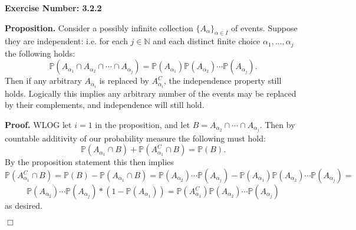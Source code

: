 \documentclass{article}
\begin{document}
\noindent \textbf{Exercise Number: 3.2.2}  %

\bigskip

\noindent \textbf{Proposition.} Consider a possibly infinite collection $\{A_{\alpha}\}_{\alpha \in I}$
of events. Suppose they are independent: i.e. for each $j \in \mathbb{N}$ and each distinct finite choice $\alpha_1, ..., \alpha_j$ the following holds: \[\mathbb{P}(A_{\alpha_1} \cap A_{\alpha_2} \cap \cdots \cap A_{\alpha_j}) = \mathbb{P} (A_{\alpha_1}) \mathbb{P} (A_{\alpha_2}) \cdots \mathbb{P}( A_{\alpha_j}).\] Then if any arbitrary $A_{\alpha_i}$ is replaced by $A_{\alpha_i}^C$, the independence property still holds. Logically this implies any arbitrary number of the events may be replaced by their complements, and independence will still hold. 

\bigskip

\noindent \textbf{Proof.} WLOG let $i = 1$ in the proposition, and let $B =  A_{\alpha_2} \cap \cdots \cap A_{\alpha_j}$. Then by countable additivity of our probability measure the following must hold: \[\mathbb{P}(A_{\alpha_1} \cap B) + \mathbb{P}(A_{\alpha_1}^C \cap B)  =\mathbb{P}(B).\] By the proposition statement this then implies \[\mathbb{P}(A_{\alpha_1}^C \cap B)  = \mathbb{P}(B) - \mathbb{P}(A_{\alpha_1} \cap B) =  \mathbb{P} (A_{\alpha_2}) \cdots \mathbb{P}( A_{\alpha_j}) - \mathbb{P} (A_{\alpha_1}) \mathbb{P} (A_{\alpha_2}) \cdots \mathbb{P}( A_{\alpha_j}) = \] \[\mathbb{P} (A_{\alpha_2}) \cdots \mathbb{P}( A_{\alpha_j}) * (1 - \mathbb{P}(A_{\alpha_1})) = \mathbb{P} (A_{\alpha_1}^C) \mathbb{P} (A_{\alpha_2}) \cdots \mathbb{P}( A_{\alpha_j})\] as desired. 

\hfill $\Box$
\end{document}
